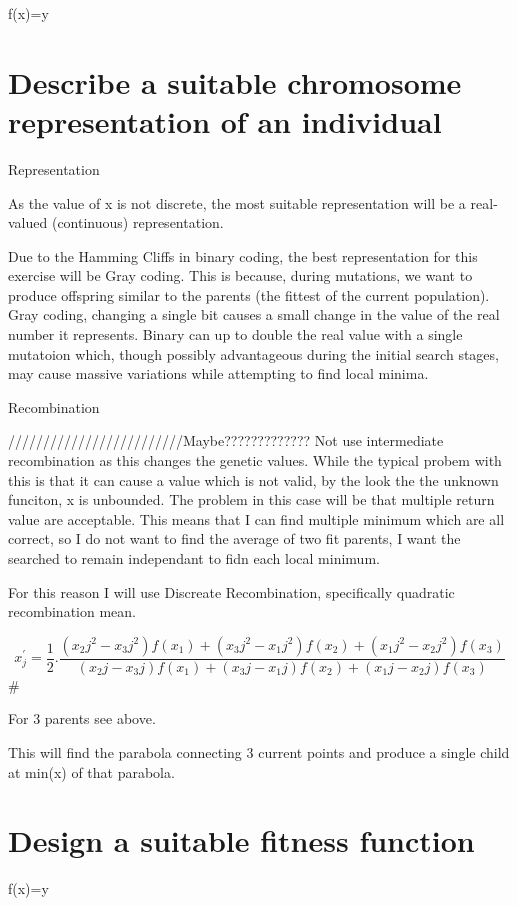 \documentclass{article}
\begin{document}
f(x)=y


\section{Describe a suitable chromosome representation of an individual}

Representation

As the value of x is not discrete, the most suitable representation will be a real-valued (continuous) representation. 

Due to the Hamming Cliffs in binary coding, the best representation for this exercise will be Gray coding. This is because, during mutations, we want to produce offspring similar to the parents (the fittest of the current population). Gray coding, changing a single bit causes a small change in the value of the real number it represents. Binary can up to double the real value with a single mutatoion which, though possibly advantageous during the initial search stages, may cause massive variations while attempting to find local minima.

Recombination

/////////////////////////Maybe?????????????
Not use intermediate recombination as this changes the genetic values. While the typical probem with this is that it can cause a value which is not valid, by the look the the unknown funciton, x is unbounded. The problem in this case will be that multiple return value are acceptable. This means that I can find multiple minimum which are all correct, so I do not want to find the average of two fit parents, I want the searched to remain independant to fidn each local minimum. 

For this reason I will use Discreate Recombination, specifically quadratic recombination mean. 

\[ x_j^' = \frac{1}{2} . \frac{(x_2j^2 - x_3j^2)f(x_1) + (x_3j^2 - x_1j^2)f(x_2) + (x_1j^2 - x_2j^2)f(x_3)}{(x_2j - x_3j)f(x_1) + (x_3j - x_1j)f(x_2) + (x_1j - x_2j)f(x_3)} \]#

For 3 parents see above.

This will find the parabola connecting 3 current points and produce a single child at min(x) of that parabola. 

\section{Design a suitable fitness function}

f(x)=y 
\end{document}

